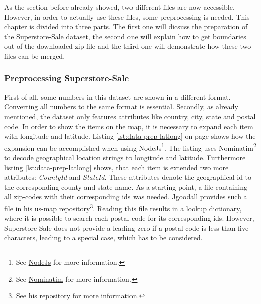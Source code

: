 As the section before already showed, two different files are now accessible. However, in order to actually use these files, some preprocessing is needed. This chapter is divided into three parts. The first one will dicsuss the preparation of the Superstore-Sale dataset, the second one will explain how to get boundaries out of the downloaded zip-file and the third one will demonstrate how these two files can be merged.

\subsubsection{Preprocessing Superstore-Sale}
First of all, some numbers in this dataset are shown in a different format. Converting all numbers to the same format is essential.
Secondly, as already mentioned, the dataset only features attributes like country, city, state and postal code. In order to show the items on the map, it is necessary to expand each item with longitude and latitude. Listing \ref{lst:data-prep-latlong} on page \pageref{lst:data-prep-latlong} shows how the expansion can be accomplished when using NodeJs\footnote{See \href{https://nodejs.org/en/}{NodeJs} for more information.}. The listing uses Nominatim\footnote{See \href{https://nominatim.openstreetmap.org/}{Nominatim} for more information.} to decode geographical location strings to longitude and latitude. Furthermore listing \ref{lst:data-prep-latlong} shows, that each item is extended two more attributes: \textit{CountyId} and \textit{StateId}. These attributes denote the geographical id to the corresponding county and state name. As a starting point, a file containing all zip-codes with their corresponding ids was needed. Jgoodall provides such a file in his us-map repository\footnote{See \href{https://github.com/jgoodall/us-maps/}{his repository} for more information.}. Reading this file results in a lookup dictionary, where it is possible to search each postal code for its corresponding ids. However, Superstore-Sale does not provide a leading zero if a postal code is less than five characters, leading to a special case, which has to be considered.

